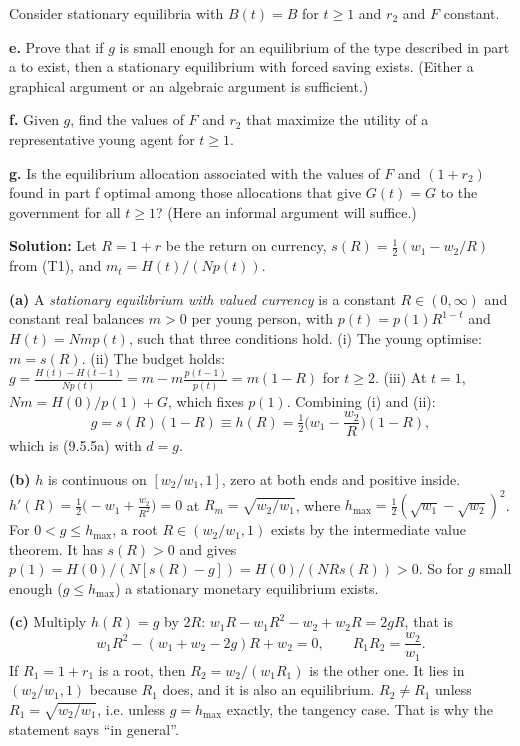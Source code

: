 \documentclass[12pt, letterpaper]{article}
\begin{document}
\begin{tcolorbox}[oddbox,title={Exercise 9.13 \quad Bryant--Keynes--Wallace}]
\begin{tcolorbox}[questionbox]
Consider stationary equilibria with $B(t)=B$ for $t\ge1$ and $r_2$ and $F$ constant.

\textbf{e.} Prove that if $g$ is small enough for an equilibrium of the type described in part a to
exist, then a stationary equilibrium with forced saving exists. (Either a graphical argument or an
algebraic argument is sufficient.)

\textbf{f.} Given $g$, find the values of $F$ and $r_2$ that maximize the utility of a
representative young agent for $t\ge1$.

\textbf{g.} Is the equilibrium allocation associated with the values of $F$ and $(1+r_2)$ found in
part f optimal among those allocations that give $G(t)=G$ to the government for all $t\ge1$? (Here an
informal argument will suffice.)
\end{tcolorbox}

\textbf{Solution:} Let $R=1+r$ be the return on currency, $s(R)=\frac12(w_1-w_2/R)$ from (T1), and
$m_t=H(t)/(Np(t))$.

\textbf{(a)} A \emph{stationary equilibrium with valued currency} is a constant $R\in(0,\infty)$ and
constant real balances $m>0$ per young person, with $p(t)=p(1)R^{1-t}$ and $H(t)=Nmp(t)$, such that
three conditions hold. (i) The young optimise: $m=s(R)$. (ii) The budget holds:
$g=\frac{H(t)-H(t-1)}{Np(t)}=m-m\frac{p(t-1)}{p(t)}=m(1-R)$ for $t\ge2$. (iii) At $t=1$,
$Nm=H(0)/p(1)+G$, which fixes $p(1)$. Combining (i) and (ii):
\[
g=s(R)(1-R)\equiv h(R)=\tfrac12\Big(w_1-\frac{w_2}R\Big)(1-R),
\]
which is (9.5.5a) with $d=g$.

\textbf{(b)} $h$ is continuous on $[w_2/w_1,1]$, zero at both ends and positive inside.
$h'(R)=\frac12\big(-w_1+\frac{w_2}{R^2}\big)=0$ at $R_m=\sqrt{w_2/w_1}$, where
$h_{\max}=\frac12(\sqrt{w_1}-\sqrt{w_2})^2$. For $0<g\le h_{\max}$, a root $R\in(w_2/w_1,1)$ exists by
the intermediate value theorem. It has $s(R)>0$ and gives $p(1)=H(0)/(N[s(R)-g])=H(0)/(NRs(R))>0$.
So for $g$ small enough ($g\le h_{\max}$) a stationary monetary equilibrium exists.

\textbf{(c)} Multiply $h(R)=g$ by $2R$: $w_1R-w_1R^2-w_2+w_2R=2gR$, that is
\[
w_1R^2-(w_1+w_2-2g)R+w_2=0,\qquad R_1R_2=\frac{w_2}{w_1}.
\]
If $R_1=1+r_1$ is a root, then $R_2=w_2/(w_1R_1)$ is the other one. It lies in $(w_2/w_1,1)$ because
$R_1$ does, and it is also an equilibrium. $R_2\ne R_1$ unless $R_1=\sqrt{w_2/w_1}$, i.e. unless
$g=h_{\max}$ exactly, the tangency case. That is why the statement says ``in general''.


\end{tcolorbox}
\end{document}
